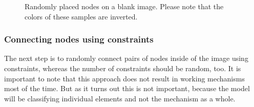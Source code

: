 \begin{figure}
\begin{subfigure}[b]{0.19\textwidth}
    \end{subfigure}
    \begin{subfigure}[b]{0.19\textwidth}
    \end{subfigure}
    \caption[Randomly placed nodes on blank image]{Randomly placed nodes on a blank image. Please note that the colors of these samples are inverted. }
    \label{fig:constraint_data_step1}
\end{figure}


\subsubsection{Connecting nodes using constraints}

The next step is to randomly connect pairs of nodes inside of the image using constraints, whereas the number of constraints should be random, too.
It is important to note that this approach does not result in working mechanisms most of the time.
But as it turns out this is not important, because the model will be classifying individual elements and not the mechanism as a whole.

